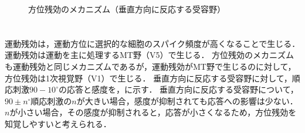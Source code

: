 \begin{figure}
    \centering
    \caption{方位残効のメカニズム（垂直方向に反応する受容野）}
    \label{fig:方位残効のメカニズム}
    \vspace{-.5cm}
\end{figure}
\section{\consideration}
運動残効は，運動方位に選択的な細胞のスパイク頻度が高くなることで生じる．運動残効は運動を主に処理するMT野（V5）で生じる．
方位残効のメカニズムも運動残効と同じメカニズムであるが，運動残効がMT野で生じるのに対して，方位残効は1次視覚野（V1）で生じる．
垂直方向に反応する受容野に対して，順応刺激\(90-10^\circ\)の応答と感度を，に示す．
垂直方向に反応する受容野について，\(90\pm n^\circ\)順応刺激の\(n\)が大きい場合，感度が抑制されても応答への影響は少ない．
\(n\)が小さい場合，その感度が抑制されると，応答が小さくなるため，方位残効を知覚しやすいと考えられる．